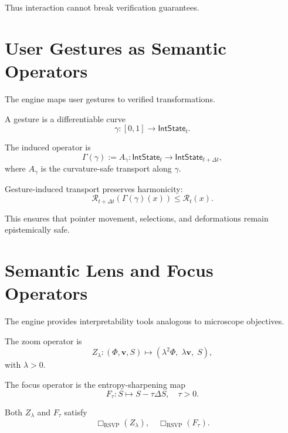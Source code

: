 Thus interaction cannot break verification guarantees.

\section{User Gestures as Semantic Operators}
\label{sec:58:gestures}

The engine maps user gestures to verified transformations.

\begin{definition}[Gesture]
A gesture is a differentiable curve
\[
\gamma : [0,1] \to \mathsf{IntState}_t.
\]
\end{definition}

\begin{definition}
The induced operator is
\[
\Gamma(\gamma) 
:= A_\gamma : \mathsf{IntState}_t \to \mathsf{IntState}_{t+\Delta t},
\]
where $A_\gamma$ is the curvature-safe transport along $\gamma$.
\end{definition}

\begin{theorem}
Gesture-induced transport preserves harmonicity:
\[
\mathcal{R}_{t+\Delta t}(\Gamma(\gamma)(x))
\le
\mathcal{R}_t(x).
\]
\end{theorem}

This ensures that pointer movement, selections, and deformations remain
epistemically safe.

\section{Semantic Lens and Focus Operators}
\label{sec:58:lens}

The engine provides interpretability tools analogous to microscope objectives.

\begin{definition}
The zoom operator is
\[
Z_\lambda : (\Phi,\mathbf{v},S) \mapsto 
(\lambda^2 \Phi,\; \lambda \mathbf{v},\; S),
\]
with $\lambda>0$.
\end{definition}

\begin{definition}
The focus operator is the entropy-sharpening map
\[
F_\tau : S \mapsto S - \tau\Delta S,
\quad \tau>0.
\]
\end{definition}

\begin{theorem}
Both $Z_\lambda$ and $F_\tau$ satisfy
\[
\Box_{\mathrm{RSVP}}(Z_\lambda),\quad
\Box_{\mathrm{RSVP}}(F_\tau).
\]
\end{theorem}

